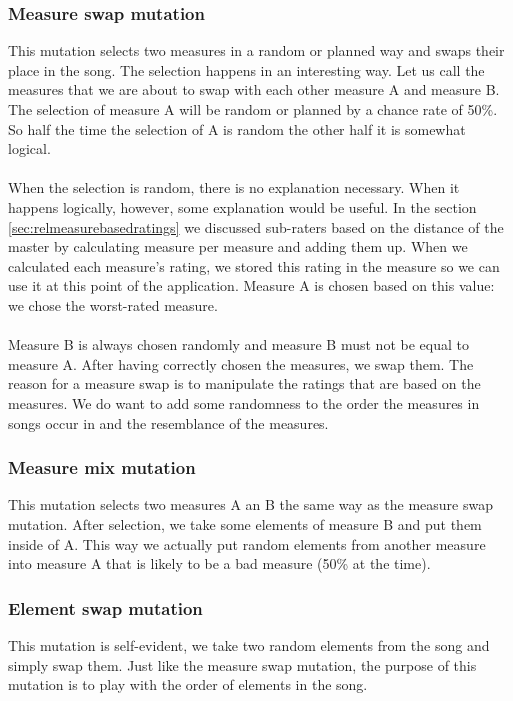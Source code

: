 \documentclass[a4paper]{article}
\begin{document}
\subsubsection{Measure swap mutation}
This mutation selects two measures in a random or planned way and swaps their place in the song. The selection happens in an interesting way. Let us call the measures that we are about to swap with each other measure A and measure B. The selection of measure A will be random or planned by a chance rate of 50\%. So half the time the selection of A is random the other half it is somewhat logical.
\\\\
When the selection is random, there is no explanation necessary. When it happens logically, however, some explanation would be useful. In the section \ref{sec:relmeasurebasedratings} we discussed sub-raters based on the distance of the master by calculating measure per measure and adding them up. When we calculated each measure's rating, we stored this rating in the measure so we can use it at this point of the application. Measure A is chosen based on this value: we chose the worst-rated measure.
\\\\
Measure B is always chosen randomly and measure B must not be equal to measure A. After having correctly chosen the measures, we swap them. The reason for a measure swap is to manipulate the ratings that are based on the measures. We do want to add some randomness to the order the measures in songs occur in and the resemblance of the measures.

\subsubsection{Measure mix mutation}
This mutation selects two measures A an B the same way as the measure swap mutation. After selection, we take some elements of measure B and put them inside of A. This way we actually put random elements from another measure into measure A that is likely to be a bad measure (50\% at the time).


\subsubsection{Element swap mutation}
This mutation is self-evident, we take two random elements from the song and simply swap them. Just like the measure swap mutation, the purpose of this mutation is to play with the order of elements in the song.
\end{document}
